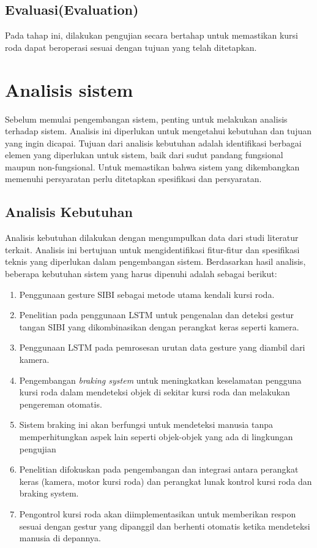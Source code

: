 \subsection{Evaluasi(Evaluation)}
Pada tahap ini, dilakukan pengujian secara bertahap untuk memastikan kursi roda dapat beroperasi sesuai dengan tujuan yang telah ditetapkan.

\section{Analisis sistem}
Sebelum memulai pengembangan sistem, penting untuk melakukan analisis terhadap sistem.
Analisis ini diperlukan untuk mengetahui kebutuhan dan tujuan yang ingin dicapai. Tujuan dari analisis kebutuhan adalah identifikasi berbagai elemen yang diperlukan untuk sistem, baik dari sudut pandang fungsional maupun non-fungsional. Untuk memastikan bahwa sistem yang dikembangkan memenuhi persyaratan perlu ditetapkan spesifikasi dan persyaratan.

\subsection{Analisis Kebutuhan}
Analisis kebutuhan dilakukan dengan mengumpulkan data dari studi literatur terkait. Analisis ini bertujuan untuk mengidentifikasi fitur-fitur dan spesifikasi teknis yang diperlukan dalam pengembangan sistem. Berdasarkan hasil analisis, beberapa
kebutuhan sistem yang harus dipenuhi adalah sebagai berikut:
\begin{enumerate}[nolistsep]
    \item Penggunaan gesture SIBI sebagai metode utama kendali kursi roda.
    \item Penelitian pada penggunaan LSTM untuk pengenalan dan deteksi gestur tangan SIBI yang dikombinasikan dengan perangkat keras seperti kamera.
    \item Penggunaan LSTM pada pemrosesan urutan data gesture yang diambil dari kamera.
    \item Pengembangan \emph{braking system} untuk meningkatkan keselamatan pengguna kursi roda dalam mendeteksi objek di sekitar kursi roda dan melakukan pengereman otomatis. 
    \item Sistem braking ini akan berfungsi untuk mendeteksi manusia tanpa memperhitungkan aspek lain seperti objek-objek yang ada di lingkungan pengujian
    \item Penelitian difokuskan pada pengembangan dan integrasi antara perangkat keras (kamera, motor kursi roda) dan perangkat lunak kontrol kursi roda dan braking system.
    \item Pengontrol kursi roda akan diimplementasikan untuk memberikan respon sesuai dengan gestur yang dipanggil dan berhenti otomatis ketika mendeteksi manusia di depannya.
\end{enumerate}
